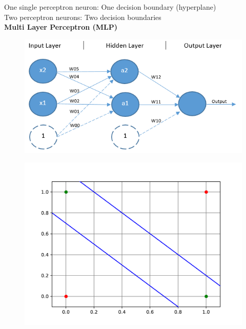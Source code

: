 \documentclass[10pt, compress]{beamer}
\begin{document}
\begin{frame}
  One single perceptron neuron: One decision boundary (hyperplane) \\
  Two perceptron neurons: Two decision boundaries \\
  \textbf{Multi Layer Perceptron (MLP)}

  \begin{multicols}{2}
    \begin{figure}
      \includegraphics[width=1.2\linewidth]{imgs/mlp_1}
    \end{figure}

    \columnbreak

    \hfill \break
    \begin{figure}
      \includegraphics[width=.7\linewidth]{imgs/xor_sep-eps-converted-to.pdf}
    \end{figure}
  \end{multicols}
\end{frame}

%
%
%
\end{document}

